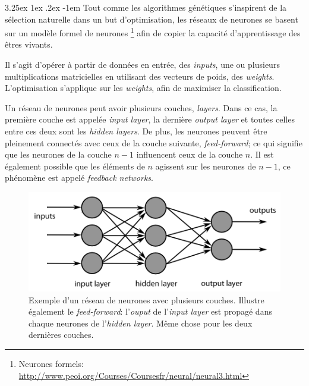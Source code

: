 \documentclass[a4paper, 11pt]{article}
\makeatletter
\renewcommand\paragraph{\@startsection{paragraph}{5}{\z@}%
  {3.25ex \@plus1ex \@minus.2ex}%
  {-1em}%
  {\normalfont\normalsize\bfseries}}
\makeatother
\begin{document}
\paragraph{}
Tout comme les algorithmes génétiques s'inspirent de la sélection naturelle dans un but d'optimisation,
les réseaux de neurones se basent sur un modèle formel de neurones
\footnote{Neurones formels: \url{http://www.peoi.org/Courses/Coursesfr/neural/neural3.html}} afin de copier la capacité 
d'apprentissage des êtres vivants.

Il s'agit d'opérer à partir de données en entrée, des \textit{inputs}, une ou plusieurs multiplications matricielles
en utilisant des vecteurs de poids, des \textit{weights}. L'optimisation s'applique sur les \textit{weights},
afin de maximiser la classification.

Un réseau de neurones peut avoir plusieurs couches, \textit{layers}. Dans ce cas, la première couche est
appelée \textit{input layer}, la dernière \textit{output layer} et toutes celles entre ces deux sont
les \textit{hidden layers}. De plus, les neurones peuvent être pleinement connectés avec ceux de la couche
suivante, \textit{feed-forward}; ce qui signifie que les neurones de la couche $n-1$ influencent ceux de
la couche $n$. Il est également possible que les éléments de $n$ agissent sur les neurones de $n-1$, ce
phénomène est appelé \textit{feedback networks}.

\begin{figure}[H]
\centering
\includegraphics[scale=0.4]{images/neural_net_feedforward}
\caption[]{Exemple d'un réseau de neurones avec plusieurs couches. Illustre également
le \textit{feed-forward}: l'\textit{ouput} de l'\textit{input layer} est propagé dans chaque
neurones de l'\textit{hidden layer}. Même chose pour les deux dernières couches.\footnotemark}
\end{figure}

\end{document}

